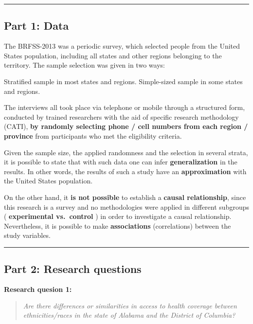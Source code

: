 \documentclass[]{article}
\begin{document}
\begin{center}\rule{0.5\linewidth}{\linethickness}\end{center}

\hypertarget{part-1-data}{%
\subsection{Part 1: Data}\label{part-1-data}}

The BRFSS-2013 was a periodic survey, which selected people from the
United States population, including all states and other regions
belonging to the territory. The sample selection was given in two ways:

Stratified sample in most states and regions. Simple-sized sample in
some states and regions.

The interviews all took place via telephone or mobile through a
structured form, conducted by trained researchers with the aid of
specific research methodology (CATI), \textbf{by randomly selecting
phone / cell numbers from each region / province} from participants who
met the eligibility criteria.

Given the sample size, the applied randomness and the selection in
several strata, it is possible to state that with such data one can
infer \textbf{generalization} in the results. In other words, the
results of such a study have an \textbf{approximation} with the United
States population.

On the other hand, it \textbf{is not possible} to establish a
\textbf{causal relationship}, since this research is a survey and no
methodologies were applied in different subgroups ( \textbf{experimental
vs.~control} ) in order to investigate a causal relationship.
Nevertheless, it is possible to make \textbf{associations}
(correlations) between the study variables.

\begin{center}\rule{0.5\linewidth}{\linethickness}\end{center}

\hypertarget{part-2-research-questions}{%
\subsection{Part 2: Research
questions}\label{part-2-research-questions}}

\textbf{Research quesion 1:}

\begin{quote}
\emph{Are there differences or similarities in access to health coverage
between ethnicities/races in the state of Alabama and the District of
Columbia?}
\end{quote}
\end{document}
